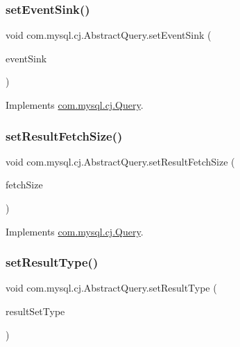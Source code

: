 \subsubsection{\texorpdfstring{set\+Event\+Sink()}{setEventSink()}}
{\footnotesize\ttfamily void com.\+mysql.\+cj.\+Abstract\+Query.\+set\+Event\+Sink (\begin{DoxyParamCaption}\item[{\mbox{\hyperlink{interfacecom_1_1mysql_1_1cj_1_1log_1_1_profiler_event_handler}{Profiler\+Event\+Handler}}}]{event\+Sink }\end{DoxyParamCaption})}



Implements \mbox{\hyperlink{interfacecom_1_1mysql_1_1cj_1_1_query_ad50d1ecd73b6b2cac60cff6bec83bfbf}{com.\+mysql.\+cj.\+Query}}.

\mbox{\label{classcom_1_1mysql_1_1cj_1_1_abstract_query_a02cd9bee7792ccf53455cd42df11b27a}} 
\subsubsection{\texorpdfstring{set\+Result\+Fetch\+Size()}{setResultFetchSize()}}
{\footnotesize\ttfamily void com.\+mysql.\+cj.\+Abstract\+Query.\+set\+Result\+Fetch\+Size (\begin{DoxyParamCaption}\item[{int}]{fetch\+Size }\end{DoxyParamCaption})}



Implements \mbox{\hyperlink{interfacecom_1_1mysql_1_1cj_1_1_query_aa27382e91d04ac9f8f6944dc3949b652}{com.\+mysql.\+cj.\+Query}}.

\mbox{\label{classcom_1_1mysql_1_1cj_1_1_abstract_query_a169b32f7a5ede30f551d3ee53b0c4ac4}} 
\subsubsection{\texorpdfstring{set\+Result\+Type()}{setResultType()}}
{\footnotesize\ttfamily void com.\+mysql.\+cj.\+Abstract\+Query.\+set\+Result\+Type (\begin{DoxyParamCaption}\item[{Resultset.\+Type}]{result\+Set\+Type }\end{DoxyParamCaption})}



